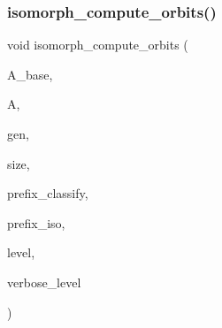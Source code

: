 \mbox{\label{isomorph__global_8_c_a592f3efd31146c0802f59837055f904f}} 
\subsubsection{\texorpdfstring{isomorph\+\_\+compute\+\_\+orbits()}{isomorph\_compute\_orbits()}}
{\footnotesize\ttfamily void isomorph\+\_\+compute\+\_\+orbits (\begin{DoxyParamCaption}\item[{\mbox{\hyperlink{classaction}{action}} $\ast$}]{A\+\_\+base,  }\item[{\mbox{\hyperlink{classaction}{action}} $\ast$}]{A,  }\item[{\mbox{\hyperlink{classgenerator}{generator}} $\ast$}]{gen,  }\item[{\mbox{\hyperlink{galois_8h_a09fddde158a3a20bd2dcadb609de11dc}{I\+NT}}}]{size,  }\item[{const \mbox{\hyperlink{galois_8h_ab6cc7b4aeb6ea31aba2b3fbfc83ff5e6}{B\+Y\+TE}} $\ast$}]{prefix\+\_\+classify,  }\item[{const \mbox{\hyperlink{galois_8h_ab6cc7b4aeb6ea31aba2b3fbfc83ff5e6}{B\+Y\+TE}} $\ast$}]{prefix\+\_\+iso,  }\item[{\mbox{\hyperlink{galois_8h_a09fddde158a3a20bd2dcadb609de11dc}{I\+NT}}}]{level,  }\item[{\mbox{\hyperlink{galois_8h_a09fddde158a3a20bd2dcadb609de11dc}{I\+NT}}}]{verbose\+\_\+level }\end{DoxyParamCaption})}

\mbox{\label{isomorph__global_8_c_aa0fe57c73d5668eee10a6022ada7f6a3}} 
